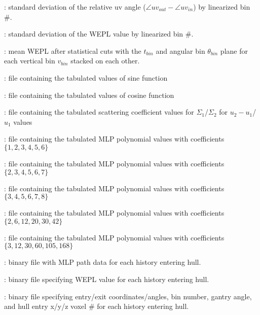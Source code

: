 \item {} : standard deviation of the relative uv angle ($\angle uv_{out} -\angle uv_{in}$) by linearized bin \#.
\item {} : standard deviation of the WEPL value by linearized bin \#.
\item {} : mean WEPL after statistical cuts with the $t_{bin}$ and angular bin $\theta_{bin}$ plane for each vertical bin $v_{bin}$ stacked on each other.
\item {} : file containing the tabulated values of sine function
\item {} : file containing the tabulated values of cosine function
\item {} : file containing the tabulated scattering coefficient values for $\Sigma_1$/$\Sigma_2$ for $u_2-u_1$/$u_1$ values
\item {} : file containing the tabulated MLP polynomial values with coefficients $\{1,2,3,4,5,6\}$
\item {} : file containing the tabulated MLP polynomial values with coefficients $\{2,3,4,5,6,7\}$
\item {} : file containing the tabulated MLP polynomial values with coefficients $\{3,4,5,6,7,8\}$
\item {} : file containing the tabulated MLP polynomial values with coefficients $\{2,6,12,20,30,42\}$
\item {} : file containing the tabulated MLP polynomial values with coefficients $\{3,12,30,60,105,168\}$
\item {} : binary file with MLP path data for each history entering hull.
\item {} : binary file specifying WEPL value for each history entering hull.
\item {} : binary file specifying entry/exit coordinates/angles, bin number, gantry angle, and hull entry x/y/z voxel \# for each history entering hull.
